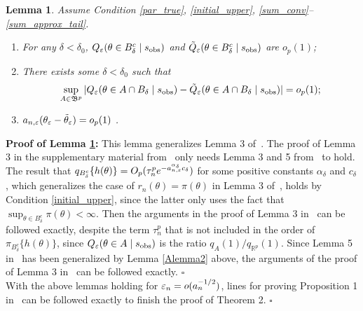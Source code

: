 \documentclass{article}
\newtheorem{lemma}{Lemma}
\begin{document}
\begin{lemma}\label{Alemma4} 
Assume Condition \ref{par_true}, \ref{initial_upper}, \ref{sum_conv}--\ref{sum_approx_tail}. 
	\begin{enumerate}
		\item[(i)] For any $\delta<\delta_{0}$, $Q_{\varepsilon}(\theta\in B_{\delta}^{c}\mid s_{\rm obs})$
		and $\tilde{Q}_{\varepsilon}(\theta\in B_{\delta}^{c}\mid s_{\rm obs})$ are $o_{p}(1)$; 
		\item[(ii)] There exists some $\delta<\delta_{0}$ such that 
		\[
		\sup_{A\in\mathfrak{B}^{p}}|Q_{\varepsilon}(\theta\in A\cap B_{\delta}\mid s_{\rm obs})-\tilde{Q}_{\varepsilon}(\theta\in A\cap B_{\delta}\mid s_{\rm obs})|=o_{p}(1);
		\]
		\item[(iii)] $a_{n,\varepsilon}(\theta_{\varepsilon}-\tilde{\theta}_{\varepsilon})=o_{p}(1)$ . 
	\end{enumerate}\end{lemma}
{\bf Proof of Lemma \ref{Alemma4}:} 
	This lemma generalizes Lemma 3 of~\cite{Li2017}. The proof of Lemma 3 in the supplementary material from~\cite{Li2017} only needs Lemma 3 and 5 from~\cite{Li2016} to hold. The result that  $q_{B_{\delta}^{c}}\{h(\theta)\}=O_{p}(\tau_{n}^{p}e^{-a_{n,\varepsilon}^{\alpha_{\delta}}c_{\delta}})$
	for some positive constants $\alpha_{\delta}$ and $c_{\delta}$, which generalizes the case of $r_{n}(\theta)=\pi(\theta)$ in Lemma 3 of~\cite{Li2016}, holds by Condition \ref{initial_upper}, since the latter only uses the fact that 
	$\sup_{\theta\in B_{\delta}^{c}}\pi(\theta)<\infty$.
	Then the arguments in the proof of Lemma 3 in~\cite{Li2016} can be followed exactly, despite the term $\tau_{n}^{p}$ that is not included in the order of $\pi_{B_{\delta}^{c}}\{h(\theta)\}$, since $Q_{\varepsilon}(\theta\in A\mid s_{{\rm obs}})$
	is the ratio $q_{A}(1)/q_{\mathbb{R}^{p}}(1)$. Since Lemma 5 in~\cite{Li2016} has been generalized by Lemma \eqref{Alemma2} above, the arguments of the proof of Lemma 3 in~\cite{Li2017} can be followed exactly.
	\hfill{$\square$} \\
	

With the above lemmas holding for $\varepsilon_n = o(a_n^{-1/2})$, lines for
proving %
Proposition 1 in~\cite{Li2017} can be followed  
exactly to finish the proof of Theorem 2. 
\hfill{$\square$} 
\end{document}

